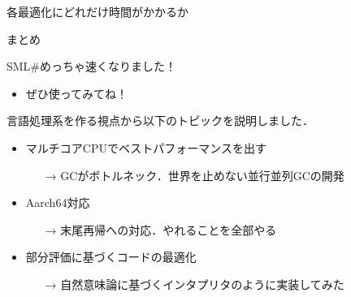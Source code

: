 \documentclass[aspectratio=169,t,dvipdfmx,12pt]{beamer}
\newcommand\smlsharp{SML\#}
\begin{document}
\begin{frame}{各最適化にどれだけ時間がかかるか}

\end{frame}

\begin{frame}{まとめ}

\smlsharp{}めっちゃ速くなりました！
\begin{itemize}
\item ぜひ使ってみてね！
\end{itemize}

\bigskip

言語処理系を作る視点から以下のトピックを説明しました．
\begin{itemize}
\item マルチコアCPUでベストパフォーマンスを出す
\begin{itemize}
\item[→]\normalsize GCがボトルネック．世界を止めない並行並列GCの開発
\end{itemize}
\item Aarch64対応
\begin{itemize}
\item[→]\normalsize 末尾再帰への対応．やれることを全部やる
\end{itemize}
\item 部分評価に基づくコードの最適化
\begin{itemize}
\item[→]\normalsize 自然意味論に基づくインタプリタのように実装してみた
\end{itemize}
\end{itemize}

\end{frame}
\end{document}
